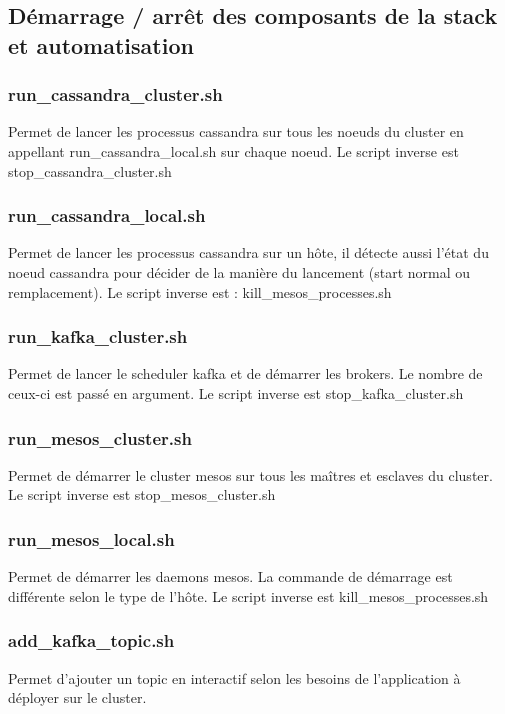 \documentclass[a4paper, 11pt, titlepage]{article}
\begin{document}
\subsection{Démarrage / arrêt des composants de la stack et automatisation}
\subsubsection*{run\_cassandra\_cluster.sh}
Permet de lancer les processus cassandra sur tous les noeuds du cluster en appellant run\_cassandra\_local.sh sur chaque noeud.
Le script inverse est stop\_cassandra\_cluster.sh

\subsubsection*{run\_cassandra\_local.sh}
Permet de lancer les processus cassandra sur un hôte, il détecte aussi l'état du noeud cassandra pour décider de la manière du lancement (start normal ou remplacement). Le script inverse est : kill\_mesos\_processes.sh

\subsubsection*{run\_kafka\_cluster.sh}
Permet de lancer le scheduler kafka et de démarrer les brokers. Le nombre de ceux-ci est passé en argument. Le script inverse est stop\_kafka\_cluster.sh

\subsubsection*{run\_mesos\_cluster.sh}
Permet de démarrer le cluster mesos sur tous les maîtres et esclaves du cluster.
Le script inverse est stop\_mesos\_cluster.sh

\subsubsection*{run\_mesos\_local.sh}
Permet de démarrer les daemons mesos. La commande de démarrage est différente selon le type de l'hôte.
Le script inverse est kill\_mesos\_processes.sh

\subsubsection*{add\_kafka\_topic.sh}
Permet d'ajouter un topic en interactif selon les besoins de l'application à déployer sur le cluster.
\end{document}
